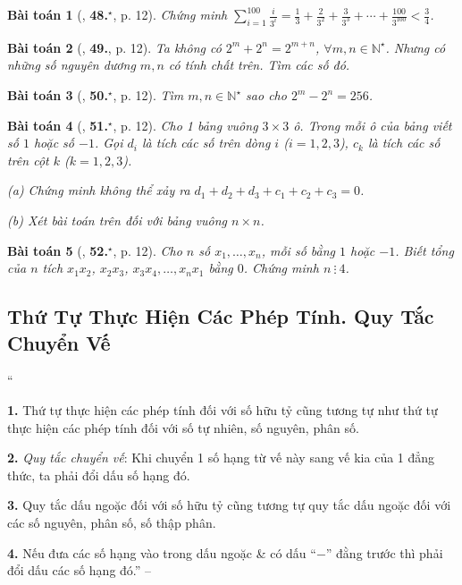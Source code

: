 \documentclass{article}
\numberwithin{equation}{section}
\newtheorem{baitoan}{Bài toán}[section]
\begin{document}
\begin{baitoan}[\cite{Binh_Toan_7_tap_1}, \textbf{48.}${}^\star$, p. 12]
	Chứng minh $\sum_{i=1}^{100} \frac{i}{3^i} = \frac{1}{3} + \frac{2}{3^2} + \frac{3}{3^3} + \cdots + \frac{100}{3^{100}} < \frac{3}{4}$.
\end{baitoan}

\begin{baitoan}[\cite{Binh_Toan_7_tap_1}, \textbf{49.}, p. 12]
	Ta không có $2^m + 2^n = 2^{m+n}$, $\forall m,n\in\mathbb{N}^\star$. Nhưng có những số nguyên dương $m,n$ có tính chất trên. Tìm các số đó.
\end{baitoan}

\begin{baitoan}[\cite{Binh_Toan_7_tap_1}, \textbf{50.}${}^\star$, p. 12]
	Tìm $m,n\in\mathbb{N}^\star$ sao cho $2^m - 2^n = 256$.
\end{baitoan}

\begin{baitoan}[\cite{Binh_Toan_7_tap_1}, \textbf{51.}${}^\star$, p. 12]
	Cho 1 bảng vuông $3\times 3$ ô. Trong mỗi ô của bảng viết số $1$ hoặc số $-1$. Gọi $d_i$ là tích các số trên dòng $i$ ($i = 1,2,3$), $c_k$ là tích các số trên cột $k$ ($k = 1,2,3$).
	\begin{enumerate*}
		\item[(a)] Chứng minh không thể xảy ra $d_1 + d_2 + d_3 + c_1 + c_2 + c_3 = 0$.
		\item[(b)] Xét bài toán trên đối với bảng vuông $n\times n$.
	\end{enumerate*}
\end{baitoan}

\begin{baitoan}[\cite{Binh_Toan_7_tap_1}, \textbf{52.}${}^\star$, p. 12]
	Cho $n$ số $x_1,\ldots,x_n$, mỗi số bằng $1$ hoặc $-1$. Biết tổng của $n$ tích $x_1x_2$, $x_2x_3$, $x_3x_4,\ldots,x_nx_1$ bằng $0$. Chứng minh $n\ \vdots\ 4$.
\end{baitoan}


\subsection{Thứ Tự Thực Hiện Các Phép Tính. Quy Tắc Chuyển Vế}
``\begin{enumerate*}
	\item[\textbf{1.}] Thứ tự thực hiện các phép tính đối với số hữu tỷ cũng tương tự như thứ tự thực hiện các phép tính đối với số tự nhiên, số nguyên, phân số.
	\item[\textbf{2.}] \textit{Quy tắc chuyển vế}: Khi chuyển 1 số hạng từ vế này sang vế kia của 1 đẳng thức, ta phải đổi dấu số hạng đó.
	\item[\textbf{3.}] Quy tắc dấu ngoặc đối với số hữu tỷ cũng tương tự quy tắc dấu ngoặc đối với các số nguyên, phân số, số thập phân.
	\item[\textbf{4.}] Nếu đưa các số hạng vào trong dấu ngoặc \& có dấu ``$-$'' đằng trước thì phải đổi dấu các số hạng đó.'' -- \cite[\S4, p. 11]{Tuyen_Toan_7} 
\end{enumerate*}
\end{document}
